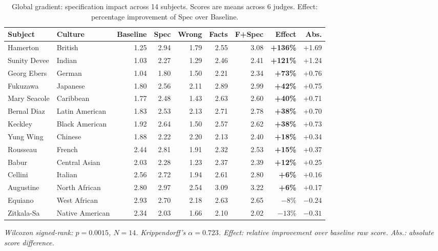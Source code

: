 \documentclass[11pt,a4paper]{article}
\begin{document}
\begin{table}[h]
\centering
\caption{Global gradient: specification impact across 14 subjects. Scores are means
across 6 judges. Effect: percentage improvement of Spec over Baseline.}
\label{tab:gradient}
\small
\begin{tabular}{llrrrrrrr}
\toprule
\textbf{Subject} & \textbf{Culture} & \textbf{Baseline} & \textbf{Spec} &
\textbf{Wrong} & \textbf{Facts} & \textbf{F+Spec} & \textbf{Effect} & \textbf{Abs.} \\
\midrule
Hamerton        & British          & 1.25 & 2.94 & 1.79 & 2.55 & 3.08 & \textbf{+136\%} & +1.69 \\
Sunity Devee    & Indian           & 1.03 & 2.27 & 1.29 & 2.46 & 2.41 & \textbf{+121\%} & +1.24 \\
Georg Ebers     & German           & 1.04 & 1.80 & 1.50 & 2.21 & 2.34 & \textbf{+73\%}  & +0.76 \\
Fukuzawa        & Japanese         & 1.80 & 2.56 & 2.11 & 2.89 & 2.99 & \textbf{+42\%}  & +0.75 \\
Mary Seacole    & Caribbean        & 1.77 & 2.48 & 1.43 & 2.63 & 2.60 & \textbf{+40\%}  & +0.71 \\
Bernal Diaz     & Latin American   & 1.83 & 2.53 & 2.13 & 2.71 & 2.78 & \textbf{+38\%}  & +0.70 \\
Keckley         & Black American   & 1.92 & 2.64 & 1.50 & 2.57 & 2.62 & \textbf{+38\%}  & +0.73 \\
Yung Wing       & Chinese          & 1.88 & 2.22 & 2.20 & 2.13 & 2.40 & \textbf{+18\%}  & +0.34 \\
Rousseau        & French           & 2.44 & 2.81 & 1.91 & 2.32 & 2.53 & \textbf{+15\%}  & +0.37 \\
Babur           & Central Asian    & 2.03 & 2.28 & 1.23 & 2.37 & 2.39 & \textbf{+12\%}  & +0.25 \\
Cellini         & Italian          & 2.56 & 2.72 & 1.94 & 2.61 & 2.80 & \textbf{+6\%}   & +0.16 \\
Augustine       & North African    & 2.80 & 2.97 & 2.54 & 3.09 & 3.22 & \textbf{+6\%}   & +0.17 \\
Equiano         & West African     & 2.93 & 2.70 & 2.18 & 2.63 & 2.65 & $-8\%$          & $-0.24$ \\
Zitkala-Sa      & Native American  & 2.34 & 2.03 & 1.66 & 2.10 & 2.02 & $-13\%$         & $-0.31$ \\
\bottomrule
\end{tabular}

\vspace{0.3em}
\noindent\small\textit{Wilcoxon signed-rank: $p=0.0015$, $N=14$.
Krippendorff's $\alpha=0.723$. Effect: relative improvement over baseline raw score.
Abs.: absolute score difference.}
\end{table}
\end{document}
